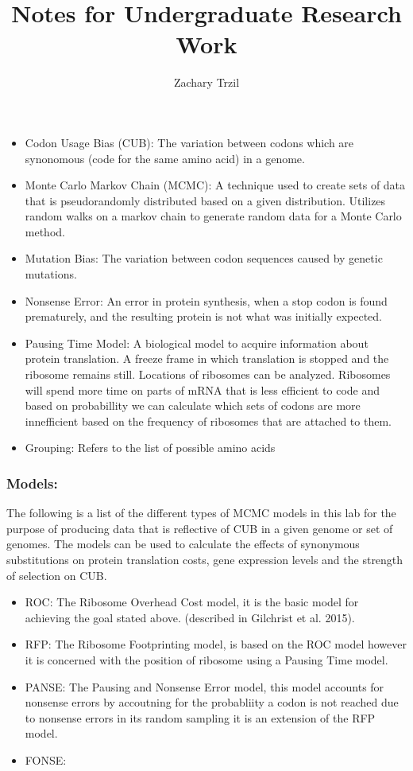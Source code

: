 \documentclass[12pt,hyperref]{labbook}
\title{Notes for Undergraduate Research Work}
\author{Zachary Trzil}
\begin{document}
\maketitle
\newpage
\tableofcontents
\newpage




\begin{itemize} 
	\item Codon Usage Bias (CUB): The variation between codons which are synonomous (code for the same amino acid) in a genome.
	\item Monte Carlo Markov Chain (MCMC): A technique used to create sets of data that is pseudorandomly distributed based on a given distribution. Utilizes random walks on a markov chain to generate random data for a Monte Carlo method.
	\item Mutation Bias: The variation between codon sequences caused by genetic mutations.
	\item Nonsense Error: An error in protein synthesis, when a stop codon is found prematurely, and the resulting protein is not what was initially expected.
	\item Pausing Time Model: A biological model to acquire information about protein translation. A freeze frame in which translation is stopped and the ribosome remains still. Locations of ribosomes can be analyzed. Ribosomes will spend more time on parts of mRNA that is less efficient to code and based on probabillity we can calculate which sets of codons are more innefficient based on the frequency of ribosomes that are attached to them.
    \item Grouping: Refers to the list of possible amino acids
\end{itemize}


\subsubsection{Models:}
The following is a list of the different types of MCMC models in this lab for the purpose of producing data that is reflective of CUB in a given genome or set of genomes. The models can be used to calculate the effects of synonymous substitutions on protein translation costs, gene expression levels and the strength of selection on CUB.
\begin{itemize}
	\item ROC: The Ribosome Overhead Cost model, it is the basic model for achieving the goal stated above. (described in Gilchrist et al. 2015).
	\item RFP: The Ribosome Footprinting model, is based on the ROC model however it is concerned with the position of ribosome using a Pausing Time model.
	\item PANSE: The Pausing and Nonsense Error model, this model accounts for nonsense errors by accoutning for the probabliity a codon is not reached due to nonsense errors in its random sampling it is an extension of the RFP model.
	\item FONSE: 
\end{itemize}
\end{document}
